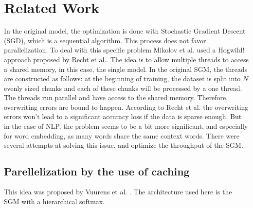 
\section{Related Work}
In the original model, the optimization is done with Stochastic Gradient Descent (SGD), which is a sequential algorithm. This process does not favor parallelization. To deal with this specific problem Mikolov et al.\cite{mikolov2} used a Hogwild! approach proposed by Recht et al.\cite{hogwild}. The idea is to allow multiple threads to access a shared memory, in this case, the single model. In the original SGM, the threads are constructed as follows: at the beginning of training, the dataset is split into $N$ evenly sized chunks and each of these chunks will be processed by a one thread. The threads run parallel and have access to the shared memory. Therefore, overwriting errors are bound to happen. According to Recht et al.\cite{hogwild} the overwriting errors won't lead to a significant accuracy loss if the data is sparse enough. But in the case of NLP, the problem seems to be a bit more significant, and especially for word embedding, as many words share the same context words. There were several attempts at solving this issue, and optimize the throughput of the SGM.

\subsection{Parellelization by the use of caching}
This idea was proposed by Vuurens et al. \cite{efficient}. The architecture used here is the SGM with a hierarchical softmax. 

